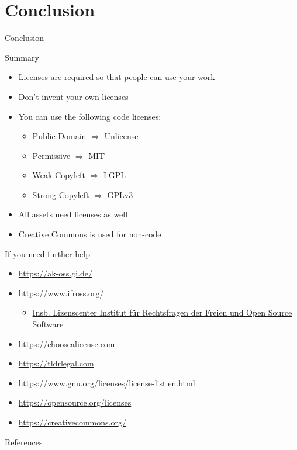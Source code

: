 \documentclass[compress,aspectratio=169]{beamer}
\begin{document}
  \section{Conclusion}

  \begin{frame}{Conclusion}
		\label{pg:lastpage} %
    \begin{block}{Summary}
      \begin{itemize}
        \item Licenses are required so that people can use your work
        \item Don't invent your own licenses
        \item You can use the following code licenses:
          \begin{itemize}
            \item Public Domain $\Rightarrow$ Unlicense
            \item Permissive $\Rightarrow$ MIT
            \item Weak Copyleft $\Rightarrow$ LGPL
            \item Strong Copyleft $\Rightarrow$ GPLv3
          \end{itemize}
        \item All assets need licenses as well
        \item Creative Commons is used for non-code
      \end{itemize}
    \end{block}
  \end{frame}
  \begin{frame}{If you need further help}
      \begin{itemize}
        \item \href{https://ak-oss.gi.de/}{\url{https://ak-oss.gi.de/}}
        \item \href{https://www.ifross.org/}{\url{https://www.ifross.org/}}
          \begin{itemize}
            \item \href{https://ifross.github.io/ifrOSS/Lizenzcenter}{Insb. Lizenscenter Institut für Rechtsfragen der Freien und Open Source Software}
          \end{itemize}
        \item \href{https://choosealicense.com/}{\url{https://choosealicense.com}}
        \item \href{https://tldrlegal.com/}{\url{https://tldrlegal.com}}
        \item \href{https://www.gnu.org/licenses/license-list.en.html}{\url{https://www.gnu.org/licenses/license-list.en.html}}
        \item \href{https://opensource.org/licenses}{\url{https://opensource.org/licenses}}
        \item \href{https://creativecommons.org/}{\url{https://creativecommons.org/}}
      \end{itemize}
  \end{frame}

  \begin{frame}[allowframebreaks]{References}
		\renewcommand*{\bibfont}{\normalfont\scriptsize}
		\printbibliography[heading=none]
	\end{frame}
\end{document}
